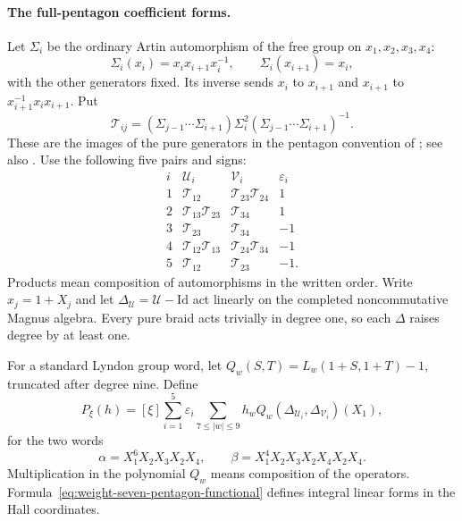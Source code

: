 \paragraph{The full-pentagon coefficient forms.}
Let $\Sigma_i$ be the ordinary Artin automorphism of the free group
on $x_1,x_2,x_3,x_4$:
\[
 \Sigma_i(x_i)=x_ix_{i+1}x_i^{-1},\qquad
 \Sigma_i(x_{i+1})=x_i,
\]
with the other generators fixed. Its inverse sends $x_i$ to
$x_{i+1}$ and $x_{i+1}$ to $x_{i+1}^{-1}x_ix_{i+1}$.
Put
\[
 \mathcal T_{ij}=(\Sigma_{j-1}\cdots\Sigma_{i+1})
                 \Sigma_i^2
                 (\Sigma_{j-1}\cdots\Sigma_{i+1})^{-1}.
\]
These are the images of the pure generators in the pentagon
convention of \cite[Section~5, equation~(17) and the following displayed
formula]{Enriquez2007}; see also \cite[Section~1]{NS2000}.
Use the following five pairs and signs:
\[
\begin{array}{c|c|c|r}
i&\mathcal U_i&\mathcal V_i&\varepsilon_i\\ \hline
1&\mathcal T_{12}&\mathcal T_{23}\mathcal T_{24}&1\\
2&\mathcal T_{13}\mathcal T_{23}&\mathcal T_{34}&1\\
3&\mathcal T_{23}&\mathcal T_{34}&-1\\
4&\mathcal T_{12}\mathcal T_{13}&\mathcal T_{24}\mathcal T_{34}&-1\\
5&\mathcal T_{12}&\mathcal T_{23}&-1.
\end{array}
\]
Products mean composition of automorphisms in the written order.
Write $x_j=1+X_j$ and let $\Delta_{\mathcal U}=\mathcal U-\mathrm{Id}$
act linearly on the completed noncommutative Magnus algebra.
Every pure braid acts trivially in degree one, so each $\Delta$
raises degree by at least one.

For a standard Lyndon group word, let
$Q_w(S,T)=L_w(1+S,1+T)-1$, truncated after degree nine. Define
\begin{equation}\label{eq:weight-seven-pentagon-functional}
 P_\xi(h)=[\xi]\sum_{i=1}^5\varepsilon_i
       \sum_{7\le |w|\le9}h_w
       Q_w(\Delta_{\mathcal U_i},\Delta_{\mathcal V_i})(X_1),
\end{equation}
for the two words
\[
 \alpha=X_1^6X_2X_3X_2X_4,
 \qquad
 \beta=X_1^4X_2X_3X_2X_4X_2X_4.
\]
Multiplication in the polynomial $Q_w$ means composition of the
operators. Formula~\eqref{eq:weight-seven-pentagon-functional}
defines integral linear forms in the Hall coordinates.

